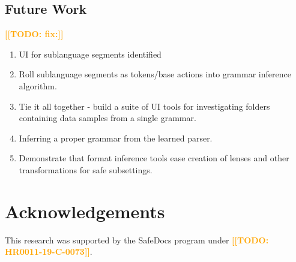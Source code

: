 \documentclass[conference,12pt]{IEEEtran}
\newcommand{\note}[1]{\noteYes{#1}}
\newcommand{\noteYes}[1]{\textbf{\textcolor{orange}{[[#1]]}}}
\newcommand{\todo}[1]{\note{TODO: #1}}
\begin{document}
\subsection{Future Work}
\todo{fix:}
\begin{enumerate}
    \item UI for sublanguage segments identified
    \item Roll sublanguage segments as tokens/base actions into grammar inference algorithm.
    \item Tie it all together - build a suite of UI tools for investigating folders containing data samples from a single grammar.
    \item Inferring a proper grammar from the learned parser.
    \item Demonstrate that format inference tools ease creation of lenses and other transformations for safe subsettings.
\end{enumerate}


\section*{Acknowledgements}

This research was supported by the SafeDocs program under \todo{HR0011-19-C-0073}.




% 
\end{document}
